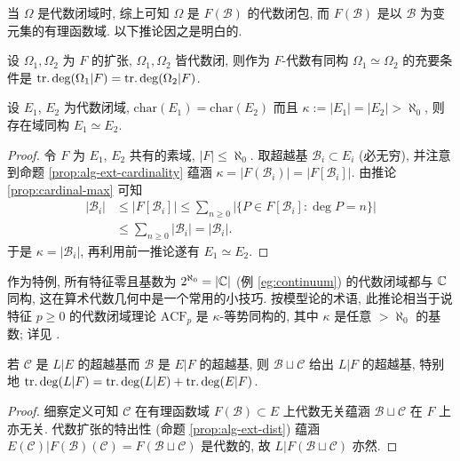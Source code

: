 当 $\Omega$ 是代数闭域时, 综上可知 $\Omega$ 是 $F(\mathcal{B})$ 的代数闭包, 而 $F(\mathcal{B})$ 是以 $\mathcal{B}$ 为变元集的有理函数域. 以下推论因之是明白的.
\begin{corollary}
	设 $\Omega_1, \Omega_2$ 为 $F$ 的扩张, $\Omega_1, \Omega_2$ 皆代数闭, 则作为 $F$-代数有同构 $\Omega_1 \simeq \Omega_2$ 的充要条件是 $\operatorname{tr.deg}(\Omega_1|F) = \operatorname{tr.deg}(\Omega_2|F)$.
\end{corollary}

\begin{corollary}\label{prop:ACF-categoricity}
	设 $E_1$, $E_2$ 为代数闭域, $\mathrm{char}(E_1)=\mathrm{char}(E_2)$ 而且 $\kappa := |E_1| = |E_2| > \aleph_0$, 则存在域同构 $E_1 \simeq E_2$.
\end{corollary}
\begin{proof}
	令 $F$ 为 $E_1$, $E_2$ 共有的素域, $|F| \leq \aleph_0$. 取超越基 $\mathcal{B}_i \subset E_i$ (必无穷), 并注意到命题 \ref{prop:alg-ext-cardinality} 蕴涵 $\kappa = |F(\mathcal{B}_i)| = |F[\mathcal{B}_i]|$. 由推论 \ref{prop:cardinal-max} 可知
	\begin{align*}
		|\mathcal{B}_i| & \leq |F[\mathcal{B}_i]| \leq \sum_{n \geq 0} \left| \{P \in F[\mathcal{B}_i]: \deg P = n \} \right| \\
		& \leq \sum_{n \geq 0} |\mathcal{B}_i| = |\mathcal{B}_i|.
	\end{align*}
	于是 $\kappa = |\mathcal{B}_i|$, 再利用前一推论遂有 $E_1 \simeq E_2$.
\end{proof}
作为特例, 所有特征零且基数为 $2^{\aleph_0} = |\mathbb{C}|$ (例 \ref{eg:continuum}) 的代数闭域都与 $\mathbb{C}$ 同构, 这在算术代数几何中是一个常用的小技巧. 按模型论的术语, 此推论相当于说特征 $p \geq 0$ 的代数闭域理论 $\text{ACF}_p$ 是 $\kappa$-等势同构的, 其中 $\kappa$ 是任意 $> \aleph_0$ 的基数; 详见 \cite[\S 6.1.1 和第 8 章]{Feng17}.  

\begin{proposition}
	若 $\mathcal{C}$ 是 $L|E$ 的超越基而 $\mathcal{B}$ 是 $E|F$ 的超越基, 则 $\mathcal{B} \sqcup \mathcal{C}$ 给出 $L|F$ 的超越基, 特别地 $\operatorname{tr.deg}(L|F) = \operatorname{tr.deg}(L|E) + \operatorname{tr.deg}(E|F)$.
\end{proposition}
\begin{proof}
	细察定义可知 $\mathcal{C}$ 在有理函数域 $F(\mathcal{B}) \subset E$ 上代数无关蕴涵 $\mathcal{B} \sqcup \mathcal{C}$ 在 $F$ 上亦无关. 代数扩张的特出性 (命题 \ref{prop:alg-ext-dist}) 蕴涵 $E(\mathcal{C}) | F(\mathcal{B})(\mathcal{C}) = F(\mathcal{B} \sqcup \mathcal{C})$ 是代数的, 故 $L|F(\mathcal{B} \sqcup \mathcal{C})$ 亦然.
\end{proof}

